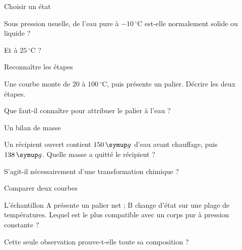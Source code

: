 \par\noindent\begin{minipage}{\linewidth}
\begin{exercice}[2]{Choisir un état}
\begin{questions}
\item Sous pression usuelle, de l’eau pure à $-10\,^{\circ}\mathrm C$ est-elle normalement solide ou liquide ?
\item Et à $25\,^{\circ}\mathrm C$ ?
\end{questions}
\end{exercice}
\end{minipage}
\par\noindent\begin{minipage}{\linewidth}
\begin{exercice}[2]{Reconnaître les étapes}
\begin{questions}
\item Une courbe monte de $20$ à $100\,^{\circ}\mathrm C$, puis présente un palier. Décrire les deux étapes.
\item Que faut-il connaître pour attribuer le palier à l’eau ?
\end{questions}
\end{exercice}
\end{minipage}
\par\noindent\begin{minipage}{\linewidth}
\begin{exercice}[2]{Un bilan de masse}
\begin{questions}
\item Un récipient ouvert contient $150\unite g$ d’eau avant chauffage, puis $138\unite g$. Quelle masse a quitté le récipient ?
\item S’agit-il nécessairement d’une transformation chimique ?
\end{questions}
\end{exercice}
\end{minipage}
\par\noindent\begin{minipage}{\linewidth}
\begin{exercice}[2]{Comparer deux courbes}
\begin{questions}
\item L’échantillon A présente un palier net ; B change d’état sur une plage de températures. Lequel est le plus compatible avec un corps pur à pression constante ?
\item Cette seule observation prouve-t-elle toute sa composition ?
\end{questions}
\end{exercice}
\end{minipage}
